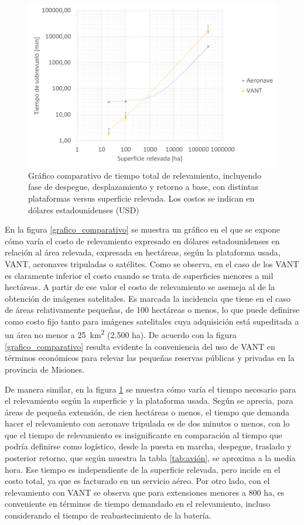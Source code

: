 \begin{figure}[h!]
    \includegraphics[width=\textwidth]{Imagenes/grafico bloque 1-II.png}
     \hfill
     \caption{Gráfico comparativo de tiempo total de relevamiento, incluyendo fase de despegue, desplazamiento y retorno a base, con distintas plataformas versus superficie relevada. Los costos se indican en dólares estadounidenses (USD)}
    \label{grafico_comparativo-II}
\end{figure}

En la figura \ref{grafico_comparativo} se muestra un gráfico en el que se expone cómo varía el costo de relevamiento expresado en dólares estadounidenses en relación al área relevada, expresada en hectáreas, según la plataforma usada, VANT, aeronaves tripuladas o satélites. Como se observa, en el caso de los VANT es claramente inferior el costo cuando se trata de superficies menores a mil hectáreas. A partir de ese valor el costo de relevamiento se asemeja al de la obtención de imágenes satelitales. Es marcada la incidencia que tiene en el caso de áreas relativamente pequeñas, de 100 hectáreas o menos, lo que puede definirse como costo fijo tanto para imágenes satelitales cuya adquisición está supeditada a un área no menor a \SI{25}{\kilo\metre\squared} (2.500 ha). De acuerdo con la figura \ref{grafico_comparativo} resulta evidente la conveniencia del uso de VANT en términos económicos para relevar las pequeñas reservas públicas y privadas en la provincia de Misiones.

De manera similar, en la figura \ref{grafico_comparativo-II} se muestra cómo varía el tiempo necesario para el relevamiento según la superficie y la plataforma usada. Según se aprecia, para áreas de pequeña extensión, de cien hectáreas o menos, el tiempo que demanda hacer el relevamiento con aeronave tripulada es de dos minutos o menos, con lo que el tiempo de relevamiento es insignificante en comparación al tiempo que podría definirse como logístico, desde la puesta en marcha, despegue, traslado y posterior retorno, que según muestra la tabla \ref{tab:avión}, se aproxima a la media hora. Ese tiempo es independiente de la superficie relevada, pero incide en el costo total, ya que es facturado en un servicio aéreo. Por otro lado, con el relevamiento con VANT se observa que para extensiones menores a 800 ha, es conveniente en términos de tiempo demandado en el relevamiento, incluso considerando el tiempo de reabastecimiento de la batería.

